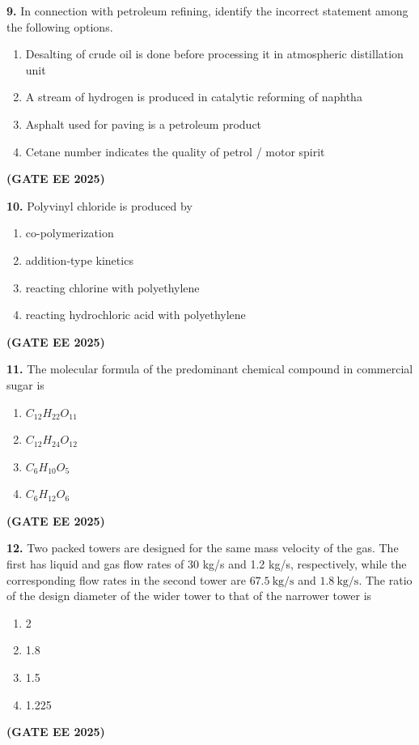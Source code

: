 \documentclass[journal,12pt,onecolumn]{IEEEtran}
\newcommand{\brak}[1]{(#1)}
\begin{document}
\noindent\textbf{9.} In connection with petroleum refining, identify the incorrect statement among the following options.
\begin{enumerate}
    \item Desalting of crude oil is done before processing it in atmospheric distillation unit
    \item A stream of hydrogen is produced in catalytic reforming of naphtha
    \item Asphalt used for paving is a petroleum product
    \item Cetane number indicates the quality of petrol / motor spirit
\end{enumerate}
\hfill \textbf{\brak{GATE EE 2025}}

\noindent\textbf{10.} Polyvinyl chloride is produced by
\begin{enumerate}
    \item co-polymerization
    \item addition-type kinetics
    \item reacting chlorine with polyethylene
    \item reacting hydrochloric acid with polyethylene
\end{enumerate}
\hfill \textbf{\brak{GATE EE 2025}}

\noindent\textbf{11.} The molecular formula of the predominant chemical compound in commercial sugar is
\begin{enumerate}
    \item $C_{12}H_{22}O_{11}$
    \item $C_{12}H_{24}O_{12}$
    \item $C_{6}H_{10}O_{5}$
    \item $C_{6}H_{12}O_{6}$
\end{enumerate}
\hfill \textbf{\brak{GATE EE 2025}}

\noindent\textbf{12.} Two packed towers are designed for the same mass velocity of the gas. The first has liquid and gas flow rates of 30 kg/s and 1.2 kg/s, respectively, while the corresponding flow rates in the second tower are $67.5~\text{kg/s}$ and $1.8~\text{kg/s}$. The ratio of the design diameter of the wider tower to that of the narrower tower is
\begin{enumerate}
    \item 2
    \item 1.8
    \item 1.5
    \item 1.225
\end{enumerate}
\hfill \textbf{\brak{GATE EE 2025}}
\end{document}
